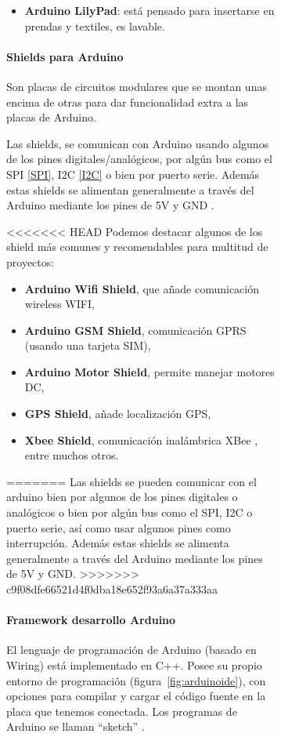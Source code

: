 \begin{itemize}
\begin{itemize}
\begin{figure}[h]
\begin{figure}[h]
\begin{itemize}
\item \textbf{Arduino LilyPad}: está pensado para insertarse en prendas y textiles, es lavable. 

\end{itemize}


\paragraph{Shields para Arduino} 

Son placas de circuitos modulares que se montan unas encima de otras para dar funcionalidad extra a las placas de Arduino.

Las shields, se comunican con Arduino usando algunos de los pines digitales/analógicos, por algún bus como el SPI \ref{SPI}, I2C \ref{I2C} o bien por puerto serie. Además estas shields se alimentan generalmente a través del Arduino mediante los pines de 5V y GND \cite{shield}.

<<<<<<< HEAD
Podemos destacar algunos de los shield más comunes y recomendables para multitud de proyectos:
\begin{itemize}
 \item \textbf{Arduino Wifi Shield}, que añade comunicación wireless WIFI, 
 \item \textbf{Arduino GSM Shield}, comunicación GPRS (usando una tarjeta SIM),
 \item \textbf{Arduino Motor Shield}, permite manejar motores DC,
 \item \textbf{GPS Shield}, añade localización GPS,
 \item \textbf{Xbee Shield}, comunicación inalámbrica XBee \cite{XBee}, entre muchos otros. 
\end{itemize}
   
=======
\bigskip
Las shields se pueden comunicar con el arduino bien por algunos de los pines digitales o analógicos o bien por algún bus como el SPI, I2C o puerto serie, así como usar algunos pines como interrupción. Además estas shields se alimenta generalmente a través del Arduino mediante los pines de 5V y GND\cite{shield}.
>>>>>>> c9f08dfe66521d4f0dba18e652f93a6a37a333aa



\paragraph{Framework desarrollo Arduino}

El lenguaje de programación de Arduino (basado en Wiring) está implementado en C++. Posee su propio entorno de programación (figura~\ref{fig:arduinoide}), con opciones para compilar y cargar el código fuente en la placa que tenemos conectada. Los programas de Arduino se llaman ``sketch'' \cite{arduino_sketch}.


\end{figure}
\end{figure}
\end{itemize}
\end{itemize}
